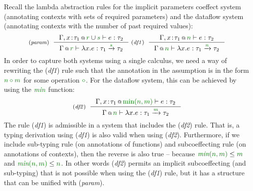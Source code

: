 Recall the lambda abstraction rules for the implicit parameters coeffect system (annotating
contexts with sets of required parameters) and the dataflow system (annotating contexts with the
number of past required values):
%
\begin{equation*}
\tyrule{param}
  {\coctx{\Gamma, x\!:\!\tau_1}{\cclrd{r} \cup \cclrd{s}} \vdash e : \tau_2}
  {\coctx{\Gamma}{\cclrd{r}} \vdash \lambda x.e : \tau_1 \xrightarrow{\cclrd{s}} \tau_2 }
\;
\tyrule{df1}
  {\coctx{\Gamma, x\!:\!\tau_1}{\cclrd{n}} \vdash e : \tau_2}
  {\coctx{\Gamma}{\cclrd{n}} \vdash \lambda x.e : \tau_1 \xrightarrow{\cclrd{n}} \tau_2 }
\end{equation*}
%
In order to capture both systems using a single calculus, we need a way of rewriting the
(\emph{df1}) rule such that the annotation in the assumption is in the form $\cclrd{n \circ m}$
for some operation $\cclrd{\circ}$. For the dataflow system, this can be achieved by using
the $\cclrd{\emph{min}}$ function:
%
\begin{equation*}
\tyrule{df2}
  {\coctx{\Gamma, x\!:\!\tau_1}{\cclrd{\textnormal{min}(n, m)}} \vdash e : \tau_2}
  {\coctx{\Gamma}{\cclrd{n}} \vdash \lambda x.e : \tau_1 \xrightarrow{\cclrd{m}} \tau_2 }
\end{equation*}
%
The rule (\emph{df1}) is admissible in a system that includes the (\emph{df2}) rule. That is,
a typing derivation using (\emph{df1}) is also valid when using (\emph{df2}). Furthermore,
if we include sub-typing rule (on annotations of functions) and subcoeffecting rule (on
annotations of contexts), then the reverse is also true -- because
$\cclrd{\textit{min}(n, m)} \leq \cclrd{m}$ and $\cclrd{\textit{min}(n, m)} \leq \cclrd{n}$.
In other words (\emph{df2}) permits an implicit subcoeffecting (and sub-typing) that is not
possible when using the (\emph{df1}) rule, but it has a structure that can be unified
with (\emph{param}).


%
%

